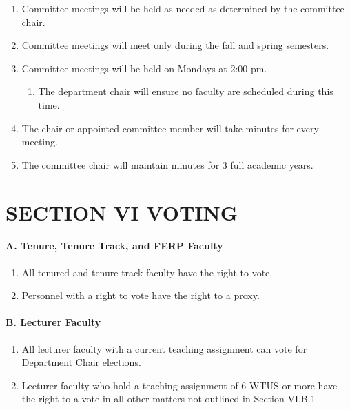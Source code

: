 \documentclass{scrartcl}
\begin{document}
\begin{enumerate}
\begin{enumerate}
\item Committee meetings will be held as needed as determined by the committee chair.
\item Committee meetings will meet only during the fall and spring semesters.
\item Committee meetings will be held on Mondays at 2:00 pm.
\begin{enumerate}[label=\alph*.]
\item The department chair will ensure no faculty are scheduled during this time.
\end{enumerate}
\item The chair or appointed committee member will take minutes for every meeting.
\item The committee chair will maintain minutes for 3 full academic years.
\end{enumerate}
\end{enumerate}

\section*{SECTION VI VOTING}
{}


\paragraph{A. Tenure, Tenure Track, and FERP Faculty}


\begin{enumerate}
\item All tenured and tenure-track faculty have the right to vote.
\item Personnel with a right to vote have the right to a proxy.

\end{enumerate}
\paragraph{B. Lecturer Faculty}


\begin{enumerate}
\item All lecturer faculty with a current teaching assignment can vote for Department Chair elections.
\item Lecturer faculty who hold a teaching assignment of 6 WTUS or more have the right to a vote in all other matters not outlined in Section VI.B.1

\end{enumerate}
\end{document}
